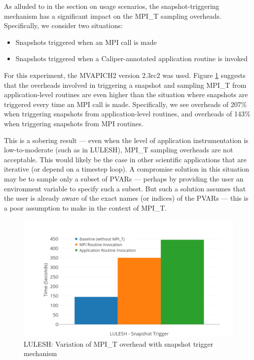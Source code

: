 \par As alluded to in the section on usage scenarios, the snapshot-triggering mechanism has a significant impact on the MPI\_T sampling overheads. Specifically, we consider two situations:
\begin{itemize}
\item Snapshots triggered when an MPI call is made
\item Snapshots triggered when a Caliper-annotated application routine is invoked
\end{itemize}
For this experiment, the MVAPICH2 version 2.3rc2 was used. Figure \ref{fig:cali-overhead-snapshot} suggests that the overheads involved in triggering a snapshot and sampling MPI\_T from application-level routines are even higher than the situation where snapshots are triggered every time an MPI call is made. Specifically, we see overheads of 207\% when triggering snapshots from application-level routines, and overheads of 143\% when triggering snapshots from MPI routines. 
\par This is a sobering result --- even when the level of application instrumentation is low-to-moderate (such as in LULESH), MPI\_T sampling overheads are not acceptable. This would likely be the case in other scientific applications that are iterative (or depend on a timestep loop). A compromise solution in this situation may be to sample only a subset of PVARs --- perhaps by providing the user an environment variable to specify such a subset. But such a solution assumes that the user is already aware of the exact names (or indices) of the PVARs --- this is a poor assumption to make in the context of MPI\_T.
\begin{center}
	\begin{figure}[bp!]
         \centering
  \captionsetup{justification=centering}
		\includegraphics[scale=0.8, width=\columnwidth, keepaspectratio]{figures/CALIPER_overheads_snapshot_trigger}
		\caption{LULESH: Variation of MPI\_T overhead with snapshot trigger mechanism}
		\label{fig:cali-overhead-snapshot}
	\end{figure}
\end{center}


